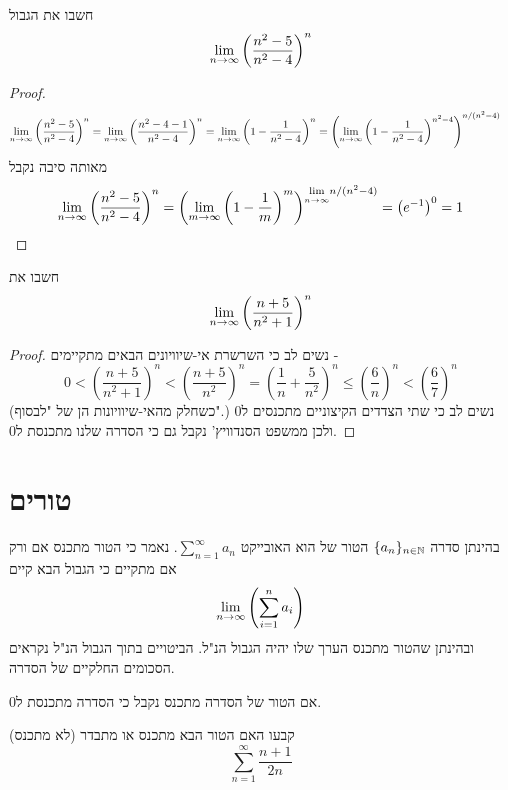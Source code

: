 \documentclass{article}
\begin{document}
\begin{exercise}
חשבו את הגבול 
\[\underset{n\rightarrow\infty}{\lim} \left(\frac{n^2-5}{n^2-4}\right)^n\]
\end{exercise}

\begin{proof}
\begin{align*}
\underset{n\rightarrow\infty}{\lim} \left(\frac{n^2-5}{n^2-4}\right)^n &= \underset{n\rightarrow\infty}{\lim} \left(\frac{n^2-4-1}{n^2-4}\right)^n = \underset{n\rightarrow\infty}{\lim} \left(1-\frac{1}{n^2-4}\right)^n = \left(\underset{n\rightarrow\infty}{\lim} \left(1-\frac{1}{n^2-4}\right)^{n^2-4}\right)^{n/(n^2-4)}
\end{align*}
מאותה סיבה נקבל 
\[\underset{n\rightarrow\infty}{\lim} \left(\frac{n^2-5}{n^2-4}\right)^n  = \left(\underset{m\rightarrow\infty}{\lim} \left(1-\frac{1}{m}\right)^{m}\right)^{\underset{n\rightarrow\infty}{\lim} n/(n^2-4)} = \left(e^{-1}\right)^0 = 1\]
\end{proof}

\begin{exercise}
חשבו את 
\[\underset{n\rightarrow\infty}{\lim} \left(\frac{n+5}{n^2+1}\right)^n\]
\end{exercise}

\begin{proof}
נשים לב כי השרשרת אי-שיוויונים הבאים מתקיימים - 
\[0<\left(\frac{n+5}{n^2+1}\right)^n<\left(\frac{n+5}{n^2}\right)^n = \left(\frac{1}{n}+\frac{5}{n^2}\right)^n \leq \left(\frac{6}{n}\right)^n <\left(\frac{6}{7}\right)^n\]
(כשחלק מהאי-שיוויונות הן של "לבסוף".) נשים לב כי שתי הצדדים הקיצוניים מתכנסים ל0 ולכן ממשפט הסנדוויץ' נקבל גם כי הסדרה שלנו מתכנסת ל0.
\end{proof}

\section{טורים}

\begin{definition}
בהינתן סדרה 
$\{a_n\}_{n\in\mathbb{N}}$
הטור של הוא האובייקט 
$\sum_{n=1}^{\infty} a_n$.
נאמר כי הטור מתכנס אם ורק אם מתקיים כי הגבול הבא קיים
\[\underset{n\rightarrow\infty}{\lim} \left(\sum_{i=1}^n a_i\right)\]
ובהינתן שהטור מתכנס הערך שלו יהיה הגבול הנ"ל. הביטויים בתוך הגבול הנ"ל נקראים הסכומים החלקיים של הסדרה.
\end{definition}

\begin{theorem}
אם הטור של הסדרה מתכנס נקבל כי הסדרה מתכנסת ל0.
\end{theorem}

\begin{exercise}
קבעו האם הטור הבא מתכנס או מתבדר (לא מתכנס)
\[\sum_{n=1}^\infty \frac{n+1}{2n}\]
\end{exercise}
\end{document}
